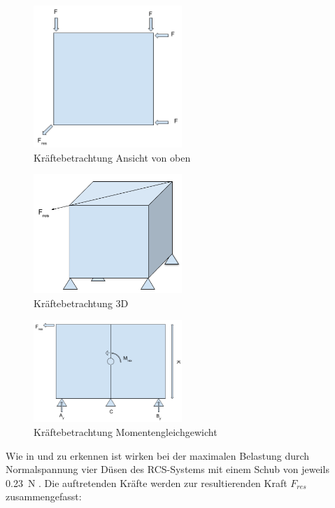 \begin{figure}[H]
	\centering
		\includegraphics[width=0.50\textwidth]{graphics/Gecko_Rechnung1.png}
	\caption{Kräftebetrachtung Ansicht von oben}
	\label{fig:Gecko_Rechnung1}
\end{figure}

\begin{figure}[H]
	\centering
		\includegraphics[width=0.50\textwidth]{graphics/Gecko_Rechnung2.png}
	\caption{Kräftebetrachtung 3D}
	\label{fig:Gecko_Rechnung2}
\end{figure}

\begin{figure}[H]
	\centering
		\includegraphics[width=0.50\textwidth]{graphics/Gecko_Rechnung3.png}
	\caption{Kräftebetrachtung Momentengleichgewicht}
	\label{fig:Gecko_Rechnung3}
\end{figure}


	Wie in  und  zu erkennen ist wirken bei der maximalen Belastung durch Normalspannung vier Düsen des RCS-Systems mit einem Schub von jeweils \SI{0,23}{\newton} . Die auftretenden Kräfte werden zur resultierenden Kraft $F_{res}$  zusammengefasst:

